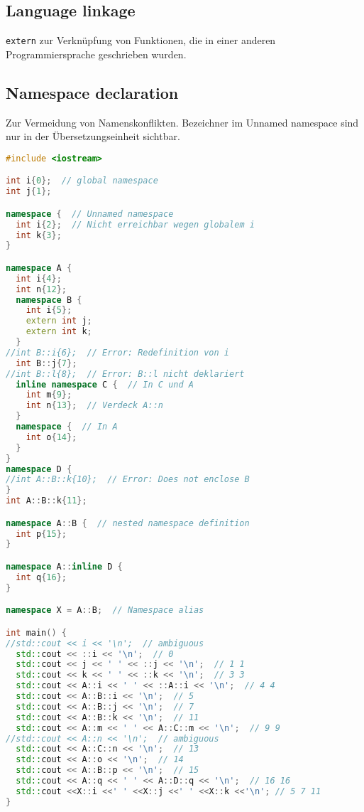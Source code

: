 \documentclass[10pt,twocolumn]{scrartcl}
\begin{document}
\subsection{Language linkage}

\lstinline|extern| zur Verknüpfung von Funktionen, die in einer anderen
Programmiersprache geschrieben wurden.

\subsection{Namespace declaration}

Zur Vermeidung von Namenskonflikten.
Bezeichner im Unnamed namespace sind nur in der Übersetzungseinheit sichtbar.

\begin{lstlisting}[language=C++]
#include <iostream>

int i{0};  // global namespace
int j{1};

namespace {  // Unnamed namespace
  int i{2};  // Nicht erreichbar wegen globalem i
  int k{3};
}

namespace A {
  int i{4};
  int n{12};
  namespace B {
    int i{5};
    extern int j;
    extern int k;
  }
//int B::i{6};  // Error: Redefinition von i
  int B::j{7};
//int B::l{8};  // Error: B::l nicht deklariert
  inline namespace C {  // In C und A
    int m{9};
    int n{13};  // Verdeck A::n
  }
  namespace {  // In A
    int o{14};
  }
}
namespace D {
//int A::B::k{10};  // Error: Does not enclose B
}
int A::B::k{11};

namespace A::B {  // nested namespace definition
  int p{15};
}

namespace A::inline D {
  int q{16};
}

namespace X = A::B;  // Namespace alias

int main() {
//std::cout << i << '\n';  // ambiguous
  std::cout << ::i << '\n';  // 0
  std::cout << j << ' ' << ::j << '\n';  // 1 1
  std::cout << k << ' ' << ::k << '\n';  // 3 3
  std::cout << A::i << ' ' << ::A::i << '\n';  // 4 4
  std::cout << A::B::i << '\n';  // 5
  std::cout << A::B::j << '\n';  // 7
  std::cout << A::B::k << '\n';  // 11
  std::cout << A::m << ' ' << A::C::m << '\n';  // 9 9
//std::cout << A::n << '\n';  // ambiguous
  std::cout << A::C::n << '\n';  // 13
  std::cout << A::o << '\n';  // 14
  std::cout << A::B::p << '\n';  // 15
  std::cout << A::q << ' ' << A::D::q << '\n';  // 16 16
  std::cout <<X::i <<' ' <<X::j <<' ' <<X::k <<'\n'; // 5 7 11
}
\end{lstlisting}
\end{document}
